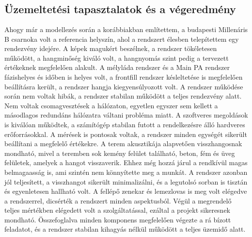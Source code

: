 \chapter{\FurtherDevelopment}
\section{Üzemeltetési tapasztalatok és a végeredmény} %
Ahogy már a modellezés során a korábbiakban említettem, a budapesti Millenáris B csarnoka 
volt a referencia helyszín, ahol a rendszert élesben telepítettem egy rendezvény idejére.
A képek magukért beszélnek, a rendszer tökéletesen működött, a hangminőség kiváló volt, a hangnyomás szint pedig
a tervezett értékeknek megfelelően alakult. A mélyláda rendszer és a Main PA rendszer fázishelyes és időben is helyes
volt, a frontfill rendszer késleltetése is megfelelően beállításra került, a rendszer hangja kiegyensúlyozott volt.
A rendszer működése során nem voltak hibák, a rendszer stabilan működött
a teljes rendezvény alatt. 
Nem voltak csomagvesztések a hálózaton, egyetlen egyszer sem kellett a másodlagos redundáns hálózatra váltani probléma miatt.
A szoftveres megoldások is kiválóan működtek, a számítógép stabilan futott a
rendelkezésre álló hardveres erőforrásokkal. A mérések is pontosak voltak, a rendszer minden egységét
sikerült beállítani a megfelelő értékekre. 
A terem akusztikája alapvetően visszhangosnak mondható, mivel a teremben sok kemény felület található,
beton, fém és üveg felületek, amelyek a hangot visszaverik. Ehhez még hozzá járul a rendkívül magas belmagaasság is,
ami szintén nem könnyítette meg a munkát. A rendszer azonban jól teljesített, a visszhangot sikerült minimalizálni,
és a legutolsó sorban is tisztán és egyenletesen hallható volt.
A fellépő zenekar és lemezlovas is meg volt elégedve a rendszerrel, dicsérték a rendszert minden aspektusból.
Végül a megrendelő teljes mértékben elégedett volt a szolgáltatással, ezáltal 
a projekt sikeresnek mondható.
Összefoglalva minden komponens megfelelően végezte a rá bízott feladatot, és a rendszer
stabilan kihagyás nélkül működött a teljes üzemidő alatt. 
